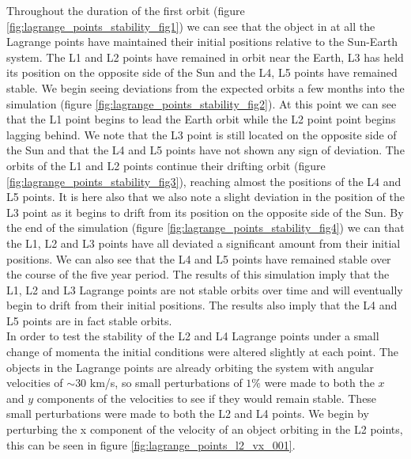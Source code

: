 \documentclass[10pt,letterpaper]{article}
\begin{document}
Throughout the duration of the first orbit (figure \ref{fig:lagrange_points_stability_fig1}) we can see that the object in at all the Lagrange points have maintained their initial positions relative to the Sun-Earth system. The L1 and L2 points have remained in orbit near the Earth, L3 has held its position on the opposite side of the Sun and the L4, L5 points have remained stable. We begin seeing deviations from the expected orbits a few months into the simulation (figure \ref{fig:lagrange_points_stability_fig2}). At this point we can see that the L1 point begins to lead the Earth orbit while the L2 point point begins lagging behind. We note that the L3 point is still located on the opposite side of the Sun and that the L4 and L5 points have not shown any sign of deviation. The orbits of the L1 and L2 points continue their drifting orbit (figure \ref{fig:lagrange_points_stability_fig3}), reaching almost the positions of the L4 and L5 points. It is here also that we also note a slight deviation in the position of the L3 point as it begins to drift from its position on the opposite side of the Sun. By the end of the simulation (figure \ref{fig:lagrange_points_stability_fig4}) we can that the L1, L2 and L3 points have all deviated a significant amount from their initial positions. We can also see that the L4 and L5 points have remained stable over the course of the five year period. The results of this simulation imply that the L1, L2 and L3 Lagrange points are not stable orbits over time and will eventually begin to drift from their initial positions. The results also imply that the L4 and L5 points are in fact stable orbits. \\

In order to test the stability of the L2 and L4 Lagrange points under a small change of momenta the initial conditions were altered slightly at each point. The objects in the Lagrange points are already orbiting the system with angular velocities of $\sim 30$ km/s, so small perturbations of $1\%$ were made to both the $x$ and $y$ components of the velocities to see if they would remain stable. These small perturbations were made to both the L2 and L4 points. We begin by perturbing the x component of the velocity of an object orbiting in the L2 points, this can be seen in figure \ref{fig:lagrange_points_l2_vx_001}.\\
\end{document}
